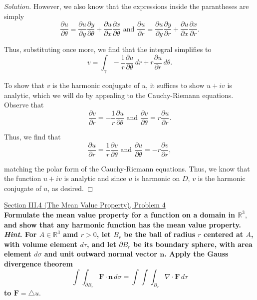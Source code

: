 \documentclass[11pt]{article}
\newenvironment{solution}
  {\renewcommand\qedsymbol{$\blacksquare$}\begin{proof}[Solution]}
  {\end{proof}}
\theoremstyle{definition}
\begin{document}
\begin{solution}
However, we also know that the expressions inside the parantheses are simply
\[ \frac{\partial u}{\partial \theta} = \frac{\partial u}{\partial y} \frac{\partial y}{\partial \theta} + \frac{\partial u}{\partial x} \frac{\partial x}{\partial \theta}
\text{ and } \frac{\partial u}{\partial r} = \frac{\partial u}{\partial y} \frac{\partial y}{\partial r} + \frac{\partial u}{\partial x} \frac{\partial x}{\partial r}. \]

Thus, substituting once more, we find that the integral simplifies to
\[ v = \int_{\gamma} -\frac{1}{r} \frac{\partial u}{\partial \theta} \, dr + r \frac{\partial u}{\partial r} \, d\theta. \]

To show that $v$ is the harmonic conjugate of $u$, it suffices to show $u+iv$ is analytic, which we will do by appealing to the Cauchy-Riemann equations. Observe that
\[ \frac{\partial v}{\partial r} = -\frac{1}{r} \frac{\partial u}{\partial \theta} \text{ and } \frac{\partial v}{\partial \theta} = r \frac{\partial u}{\partial r}. \]

Thus, we find that
\[ \frac{\partial u}{\partial r} = \frac{1}{r} \frac{\partial v}{\partial \theta} \text{ and } \frac{\partial u}{\partial \theta} = -r\frac{\partial v}{\partial r},\]

matching the polar form of the Cauchy-Riemann equations. Thus, we know that the function $u+iv$ is analytic and since $u$ is harmonic on $D$, $v$ is the harmonic conjugate of $u$, as desired.
\end{solution}

\newpage

\underline{Section III.4 (The Mean Value Property), Problem 4} \\

\textbf{Formulate the mean value property for a function on a domain in $\mathbb{R}^3,$ and show that any harmonic function has the mean value property. \textit{Hint}. For $A \in \mathbb{R}^3$ amd $r> 0$, let $B_r$ be the ball of radius $r$
centered at $A$, with volume element $d\tau$, and let $\partial B_r$ be its boundary sphere, with area element $d\sigma$ and unit outward normal vector $\textbf{n}$. 
Apply the Gauss divergence theorem \[ \int\int_{\partial B_r} \textbf{F} \cdot \textbf{n} \, d\sigma = \int\int\int_{B_r} \nabla \cdot \textbf{F} \, d\tau \] to $\textbf{F} = \triangle u.$}
\end{document}

